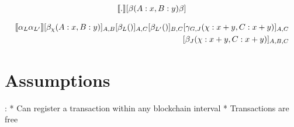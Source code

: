 \begin{align*}
  \llbracket . \rrbracket[\beta(A:x, B:y)\beta]
\end{align*}

\begin{align*}
  \adj{\alpha_L\alpha_{L'}}
  \enf{\beta_\chi(A:x, B:y)}_{A, B}
  \enf{\beta_L()}_{A,C}
  \enf{\beta_{L'}()}_{B,C}
  \enf{\gamma_{G, J}(\chi: x + y, C: x + y)}_{A, C} \\
  \enf{\beta_J(\chi: x + y, C: x + y)}_{A,B,C}
\end{align*}


\section{Assumptions}:
* Can register a transaction within any blockchain interval
* Transactions are free


